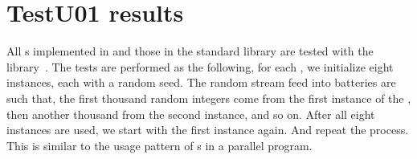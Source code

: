 %
%
%
%

\chapter{TestU01 results}
\label{chap:TestU01 results}

All \rng{}s implemented in \mckl and those in the standard library are tested
with the \testu library~\cite{Lecuyer:2007hv}. The tests are performed as the
following, for each \rng, we initialize eight instances, each with a random
seed. The random stream feed into \testu batteries are such that, the first
thousand random integers come from the first instance of the \rng, then another
thousand from the second instance, and so on. After all eight instances are
used, we start with the first instance again. And repeat the process. This is
similar to the usage pattern of \rng{}s in a parallel program.

